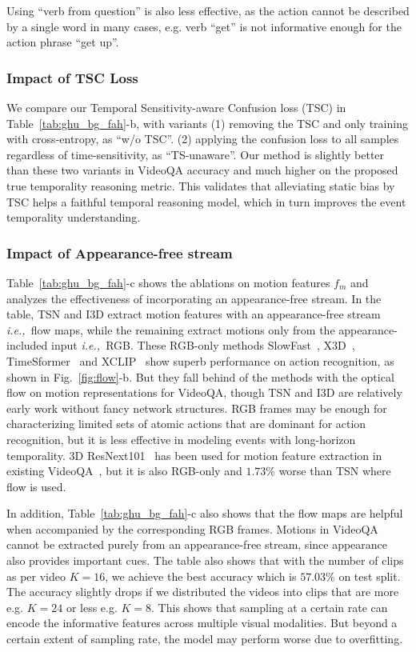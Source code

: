 \documentclass[sigconf]{acmart}
\newcommand{\ie}{\emph{i.e.,~}}
\begin{document}
 Using ``verb from question'' is also less effective, as the action cannot be described by a single word in many cases, e.g. verb ``get'' is not informative enough for the action phrase ``get up''. 



\subsubsection{Impact of TSC Loss}
We compare our Temporal Sensitivity-aware Confusion loss (TSC) in Table~\ref{tab:ghu_bg_fah}-b, with variants (1) removing the TSC and only training with cross-entropy, as ``w/o TSC''. (2) applying the confusion loss to all samples regardless of time-sensitivity, as ``TS-unaware''. Our method is slightly better than these two variants in VideoQA accuracy and much higher on the proposed true temporality reasoning metric. This validates that alleviating static bias by TSC helps a faithful temporal reasoning model, which in turn improves the event temporality understanding.


\subsubsection{Impact of Appearance-free stream}
\label{sec:exp_accl}
Table~\ref{tab:ghu_bg_fah}-c shows the ablations on motion features $f_m$ and analyzes the effectiveness of incorporating an appearance-free stream. 
In the table, TSN and I3D extract motion features with an appearance-free stream \ie flow maps, while the remaining extract motions only from the appearance-included input \ie RGB. These RGB-only methods SlowFast~\cite{feichtenhofer2019slowfast}, X3D~\cite{feichtenhofer2020x3d}, TimeSformer~\cite{bertasius2021space} and XCLIP~\cite{ni2022expanding} show superb performance on action recognition, as shown in Fig.~\ref{fig:flow}-b. But they fall behind of the methods with the optical flow on motion representations for VideoQA, though TSN and I3D are relatively early work without fancy network structures. 
RGB frames may be enough for characterizing limited sets of atomic actions that are dominant for action recognition, but it is less effective in modeling events with long-horizon temporality. 
3D ResNext101~\cite{hara3dcnns} has been used for motion feature extraction in existing VideoQA~\cite{le2020hierarchical, xiao2022hqga}, but it is also RGB-only and $1.73\%$ worse than TSN where flow is used. 

In addition, Table~\ref{tab:ghu_bg_fah}-c also shows that the flow maps are helpful when accompanied by the corresponding RGB frames. Motions in VideoQA cannot be extracted purely from an appearance-free stream, since appearance also provides important cues. The table also shows that with the number of clips as per video $K=16$, we achieve the best accuracy which is $57.03\%$ on test split. The accuracy slightly drops if we distributed the videos into clips that are more e.g. $K=24$ or less e.g. $K=8$. This shows that sampling at a certain rate can encode the informative features across multiple visual modalities. But beyond a certain extent of sampling rate, the model may perform worse due to overfitting. 
\end{document}
